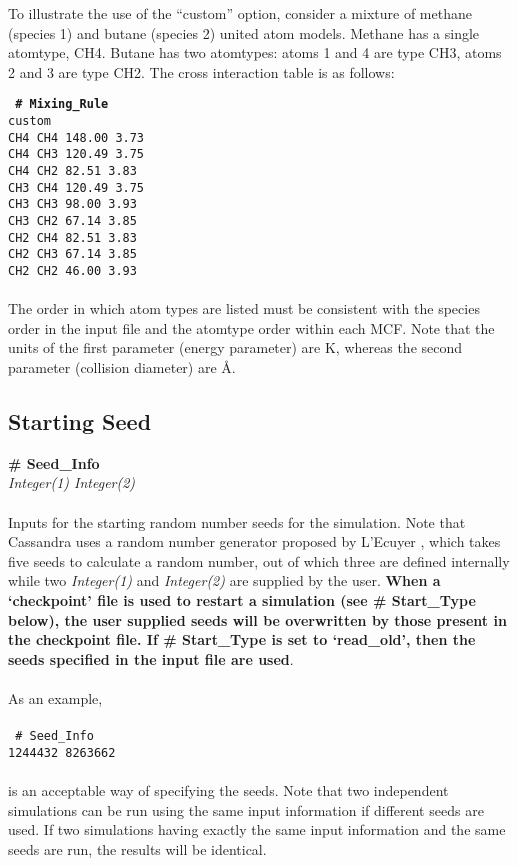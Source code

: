 To illustrate the use of the ``custom'' option, consider a mixture of methane (species 1) and butane (species 2) united atom
models. Methane has a single atomtype, CH4. Butane has two atomtypes: atoms 1 and 4 are type CH3, atoms 2 and 3 are type CH2.
The cross interaction table is as follows:

\texttt{
{\bf \# Mixing\_Rule} \\
custom\\
CH4  CH4  148.00   3.73\\
CH4  CH3  120.49   3.75\\
CH4  CH2   82.51   3.83\\
CH3  CH4  120.49   3.75\\
CH3  CH3   98.00   3.93\\
CH3  CH2   67.14   3.85\\
CH2  CH4   82.51   3.83\\
CH2  CH3   67.14   3.85\\
CH2  CH2   46.00   3.93
}
\\ \\
The order in which atom types are listed must be consistent with the species order in the input file and the atomtype order within each MCF.
Note that the units of the first parameter (energy parameter) are K, whereas the second parameter (collision diameter) are \AA.

%
%
\subsection{Starting Seed}\label{sec:Seed_Info}
{\bf \# Seed\_Info} \\ 
{\it Integer(1) Integer(2)} \\ \\
%
Inputs for the starting random number seeds for the simulation. Note
that Cassandra uses a random  number generator proposed by L'Ecuyer
\cite{random_gen:1999}, which takes five  
seeds to calculate a random number, out of which three are 
defined internally while two {\it Integer(1)} and {\it Integer(2)} are
supplied by the user. {\bf When a `checkpoint' file is used to restart a
simulation (see \# Start\_Type below), the user supplied seeds will be
overwritten by those present in the checkpoint file. If \# Start\_Type
is set to `read\_old', then the seeds specified in the input file are
used}.  \\ \\
As an example, \\ \\ 
\texttt{
\# Seed\_Info \\
1244432 8263662
} \\ \\
is an acceptable way of specifying the seeds. Note that two independent
simulations can be run using the same input information if different
seeds are used. If two simulations having exactly the same input
information and the same seeds are run, the results will be
identical. 
%
%
%

